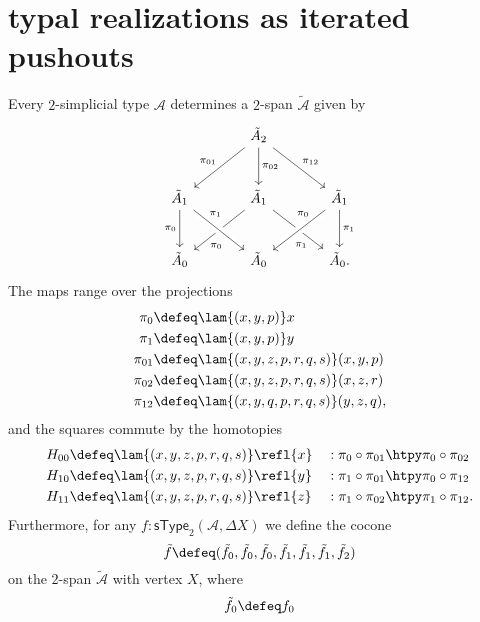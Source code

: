 \section{typal realizations as iterated pushouts}

\begin{defn}
Every $2$-simplicial type $\mathcal{A}$ determines a $2$-span $\tilde{\mathcal{A}}$ given by
\begin{equation*}
\begin{tikzcd}[column sep=large,row sep=large]
& \tilde A_2 \arrow[dl,swap,"\pi_{01}"] \arrow[d,"\pi_{02}"] \arrow[dr,"\pi_{12}"] \\
\tilde A_1 \arrow[d,swap,"\pi_0"] & \tilde A_1 \arrow[dl,"\pi_0" near end] \arrow[dr,swap,"\pi_1" near end] & \tilde A_1 \arrow[dl,crossing over,swap,"\pi_0" near start] \arrow[d,"\pi_1"] \\
\tilde A_0 & \tilde A_0 \arrow[from=ul,crossing over,"\pi_1" near start] & \tilde A_0. 
\end{tikzcd}
\end{equation*}
The maps range over the projections
\begin{align*}
\pi_0 & \defeq \lam{(x,y,p)}x\\
\pi_1 & \defeq \lam{(x,y,p)}y\\
\pi_{01} & \defeq \lam{(x,y,z,p,r,q,s)}(x,y,p) \\
\pi_{02} & \defeq \lam{(x,y,z,p,r,q,s)}(x,z,r) \\
\pi_{12} & \defeq \lam{(x,y,q,p,r,q,s)}(y,z,q),
\end{align*}
and the squares commute by the homotopies
\begin{align*}
H_{00} & \defeq \lam{(x,y,z,p,r,q,s)}\refl{x} & & : \pi_0\circ\pi_{01}\htpy \pi_0\circ \pi_{02} \\
H_{10} & \defeq \lam{(x,y,z,p,r,q,s)}\refl{y} & & : \pi_1\circ\pi_{01}\htpy \pi_0\circ \pi_{12} \\
H_{11} & \defeq \lam{(x,y,z,p,r,q,s)}\refl{z} & & : \pi_1\circ\pi_{02}\htpy \pi_1\circ \pi_{12}.
\end{align*}
Furthermore, for any $f:\mathsf{sType}_2(\mathcal{A},\Delta X)$ we define the cocone
\begin{equation*}
\tilde{f}\defeq (\tilde{f}_0,\tilde{f}_0,\tilde{f}_0,\tilde{f}_1,\tilde{f}_1,\tilde{f}_1,\tilde{f}_2)
\end{equation*}
on the $2$-span $\tilde{\mathcal{A}}$ with vertex $X$, where
\begin{align*}
\tilde{f}_0 & \defeq f_0 \\

\end{align*}
\end{defn}
